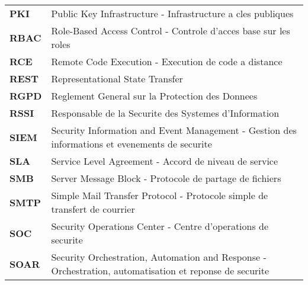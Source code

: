 \begin{longtable}{p{3cm} p{12cm}}
    \textbf{PKI}     & Public Key Infrastructure - Infrastructure a cles publiques                                            \\[0.3cm]

    \textbf{RBAC}    & Role-Based Access Control - Controle d'acces base sur les roles                                        \\[0.3cm]

    \textbf{RCE}     & Remote Code Execution - Execution de code a distance                                                   \\[0.3cm]

    \textbf{REST}    & Representational State Transfer                                                                        \\[0.3cm]

    \textbf{RGPD}    & Reglement General sur la Protection des Donnees                                                        \\[0.3cm]

    \textbf{RSSI}    & Responsable de la Securite des Systemes d'Information                                                  \\[0.3cm]

    \textbf{SIEM}    & Security Information and Event Management - Gestion des informations et evenements de securite         \\[0.3cm]

    \textbf{SLA}     & Service Level Agreement - Accord de niveau de service                                                  \\[0.3cm]

    \textbf{SMB}     & Server Message Block - Protocole de partage de fichiers                                                \\[0.3cm]

    \textbf{SMTP}    & Simple Mail Transfer Protocol - Protocole simple de transfert de courrier                              \\[0.3cm]

    \textbf{SOC}     & Security Operations Center - Centre d'operations de securite                                           \\[0.3cm]

    \textbf{SOAR}    & Security Orchestration, Automation and Response - Orchestration, automatisation et reponse de securite \\[0.3cm]


\end{longtable}
